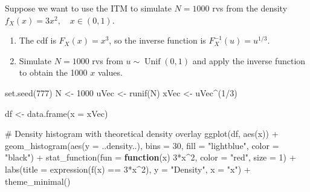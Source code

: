 \documentclass[
  letterpaper,
  DIV=11,
  numbers=noendperiod]{scrreprt}
\newenvironment{Shaded}{\begin{snugshade}}{\end{snugshade}}
\newcommand{\AttributeTok}[1]{\textcolor[rgb]{0.40,0.45,0.13}{#1}}
\newcommand{\CommentTok}[1]{\textcolor[rgb]{0.37,0.37,0.37}{#1}}
\newcommand{\ControlFlowTok}[1]{\textcolor[rgb]{0.00,0.23,0.31}{\textbf{#1}}}
\newcommand{\DecValTok}[1]{\textcolor[rgb]{0.68,0.00,0.00}{#1}}
\newcommand{\FunctionTok}[1]{\textcolor[rgb]{0.28,0.35,0.67}{#1}}
\newcommand{\NormalTok}[1]{\textcolor[rgb]{0.00,0.23,0.31}{#1}}
\newcommand{\OtherTok}[1]{\textcolor[rgb]{0.00,0.23,0.31}{#1}}
\newcommand{\SpecialCharTok}[1]{\textcolor[rgb]{0.37,0.37,0.37}{#1}}
\newcommand{\StringTok}[1]{\textcolor[rgb]{0.13,0.47,0.30}{#1}}
\begin{document}
Suppose we want to use the ITM to simulate \(N=1000\) rvs from the
density \(f_X(x)=3x^2,\quad x\in(0,1)\).

\begin{enumerate}
\def\labelenumi{\arabic{enumi}.}
\item
  The cdf is \(F_X(x)=x^3\), so the inverse function is
  \(F_X^{-1}(u)=u^{1/3}\).
\item
  Simulate \(N=1000\) rvs from \(u\sim\operatorname{Unif}(0,1)\) and
  apply the inverse function to obtain the 1000 \(x\) values.
\end{enumerate}

\begin{Shaded}
\begin{Highlighting}[]
\FunctionTok{set.seed}\NormalTok{(}\DecValTok{777}\NormalTok{)}
\NormalTok{N }\OtherTok{\textless{}{-}} \DecValTok{1000}
\NormalTok{uVec }\OtherTok{\textless{}{-}} \FunctionTok{runif}\NormalTok{(N)}
\NormalTok{xVec }\OtherTok{\textless{}{-}}\NormalTok{ uVec}\SpecialCharTok{\^{}}\NormalTok{(}\DecValTok{1}\SpecialCharTok{/}\DecValTok{3}\NormalTok{)}

\NormalTok{df }\OtherTok{\textless{}{-}} \FunctionTok{data.frame}\NormalTok{(}\AttributeTok{x =}\NormalTok{ xVec)}

\CommentTok{\# Density histogram with theoretical density overlay}
\FunctionTok{ggplot}\NormalTok{(df, }\FunctionTok{aes}\NormalTok{(x)) }\SpecialCharTok{+}
  \FunctionTok{geom\_histogram}\NormalTok{(}\FunctionTok{aes}\NormalTok{(}\AttributeTok{y =}\NormalTok{ ..density..), }\AttributeTok{bins =} \DecValTok{30}\NormalTok{,}
                 \AttributeTok{fill =} \StringTok{"lightblue"}\NormalTok{, }\AttributeTok{color =} \StringTok{"black"}\NormalTok{) }\SpecialCharTok{+}
  \FunctionTok{stat\_function}\NormalTok{(}\AttributeTok{fun =} \ControlFlowTok{function}\NormalTok{(x) }\DecValTok{3}\SpecialCharTok{*}\NormalTok{x}\SpecialCharTok{\^{}}\DecValTok{2}\NormalTok{,}
                \AttributeTok{color =} \StringTok{"red"}\NormalTok{, }\AttributeTok{size =} \DecValTok{1}\NormalTok{) }\SpecialCharTok{+}
  \FunctionTok{labs}\NormalTok{(}\AttributeTok{title =} \FunctionTok{expression}\NormalTok{(}\FunctionTok{f}\NormalTok{(x) }\SpecialCharTok{==} \DecValTok{3}\SpecialCharTok{*}\NormalTok{x}\SpecialCharTok{\^{}}\DecValTok{2}\NormalTok{),}
       \AttributeTok{y =} \StringTok{"Density"}\NormalTok{, }\AttributeTok{x =} \StringTok{"x"}\NormalTok{) }\SpecialCharTok{+} \FunctionTok{theme\_minimal}\NormalTok{()}
\end{Highlighting}
\end{Shaded}
\end{document}
